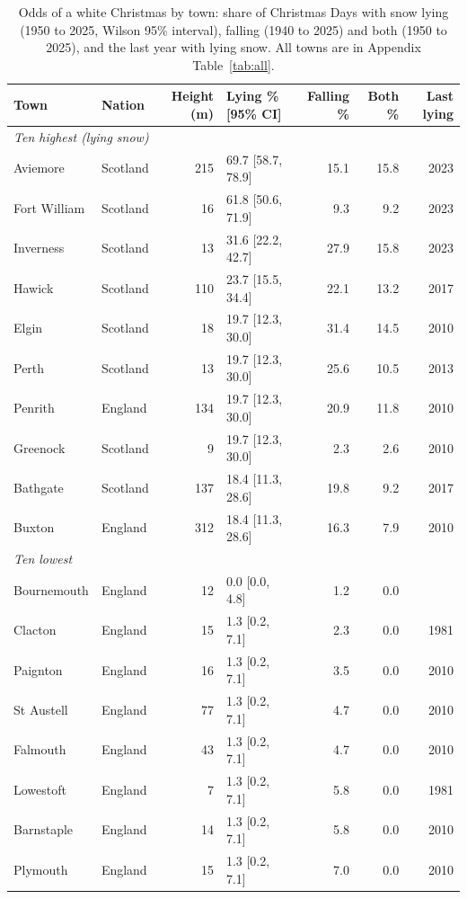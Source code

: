 \documentclass[11pt,a4paper]{article}
\begin{document}
\begin{table}[tbp]\centering\footnotesize\caption{Odds of a white Christmas by town: share of Christmas Days with snow lying (1950 to 2025, Wilson 95\% interval), falling (1940 to 2025) and both (1950 to 2025), and the last year with lying snow. All towns are in Appendix Table~\ref{tab:all}.}\label{tab:towns}\setlength{\tabcolsep}{4pt}\begin{tabular}{llrlrrr}\toprule Town & Nation & Height (m) & Lying \% [95\% CI] & Falling \% & Both \% & Last lying\\\midrule
\multicolumn{7}{l}{\textit{Ten highest (lying snow)}}\\
Aviemore & Scotland & 215 & 69.7 [58.7, 78.9] & 15.1 & 15.8 & 2023\\
Fort William & Scotland & 16 & 61.8 [50.6, 71.9] & 9.3 & 9.2 & 2023\\
Inverness & Scotland & 13 & 31.6 [22.2, 42.7] & 27.9 & 15.8 & 2023\\
Hawick & Scotland & 110 & 23.7 [15.5, 34.4] & 22.1 & 13.2 & 2017\\
Elgin & Scotland & 18 & 19.7 [12.3, 30.0] & 31.4 & 14.5 & 2010\\
Perth & Scotland & 13 & 19.7 [12.3, 30.0] & 25.6 & 10.5 & 2013\\
Penrith & England & 134 & 19.7 [12.3, 30.0] & 20.9 & 11.8 & 2010\\
Greenock & Scotland & 9 & 19.7 [12.3, 30.0] & 2.3 & 2.6 & 2010\\
Bathgate & Scotland & 137 & 18.4 [11.3, 28.6] & 19.8 & 9.2 & 2017\\
Buxton & England & 312 & 18.4 [11.3, 28.6] & 16.3 & 7.9 & 2010\\
\midrule\multicolumn{7}{l}{\textit{Ten lowest}}\\
Bournemouth & England & 12 & 0.0 [0.0, 4.8] & 1.2 & 0.0 & \\
Clacton & England & 15 & 1.3 [0.2, 7.1] & 2.3 & 0.0 & 1981\\
Paignton & England & 16 & 1.3 [0.2, 7.1] & 3.5 & 0.0 & 2010\\
St Austell & England & 77 & 1.3 [0.2, 7.1] & 4.7 & 0.0 & 2010\\
Falmouth & England & 43 & 1.3 [0.2, 7.1] & 4.7 & 0.0 & 2010\\
Lowestoft & England & 7 & 1.3 [0.2, 7.1] & 5.8 & 0.0 & 1981\\
Barnstaple & England & 14 & 1.3 [0.2, 7.1] & 5.8 & 0.0 & 2010\\
Plymouth & England & 15 & 1.3 [0.2, 7.1] & 7.0 & 0.0 & 2010\\

\end{tabular}
\end{table}
\end{document}

